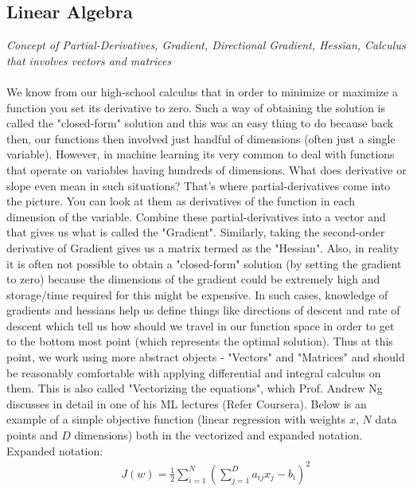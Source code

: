 \documentclass[a4paper]{article}
\begin{document}
\subsection{Linear Algebra}
\textit{Concept of Partial-Derivatives, Gradient, Directional Gradient, Hessian, Calculus that involves vectors and matrices} \\ \\
We know from our high-school calculus that in order to minimize or maximize a function you set its derivative to zero. Such a way of obtaining the solution is called the "closed-form" solution and this was an easy thing to do because back then, our functions then involved just handful of dimensions (often just a single variable). However, in machine learning its very common to deal with functions that operate on variables having hundreds of dimensions. What does derivative or slope even mean in such situations? That's where partial-derivatives come into the picture. You can look at them as derivatives of the function in each dimension of the variable. Combine these partial-derivatives into a vector and that gives us what is called the "Gradient". Similarly, taking the second-order derivative of Gradient gives us a matrix termed as the "Hessian". Also, in reality it is often not possible to obtain a "closed-form" solution (by setting the gradient to zero) because the dimensions of the gradient could be extremely high and storage/time required for this might be expensive. In such cases, knowledge of gradients and hessians help us define things like directions of descent and rate of descent which tell us how should we travel in our function space in order to get to the bottom most point (which represents the optimal solution). Thus at this point, we work using more abstract objects - "Vectors" and "Matrices" and should be reasonably comfortable with applying differential and integral calculus on them. This is also called "Vectorizing the equations", which Prof. Andrew Ng discusses in detail in one of his ML lectures (Refer Coursera). Below is an example of a simple objective function (linear regression with weights $x$, $N$ data points and $D$ dimensions) both in the vectorized and expanded notation. \\

Expanded notation:
\begin{equation} \label{eq:4}
\begin{aligned}
& & J(w) = \frac{1}{2} \sum_{i=1}^{N} (\sum_{j=1}^{D} a_{ij} x_j - b_i)^2
\end{aligned}
\end{equation}
\end{document}
